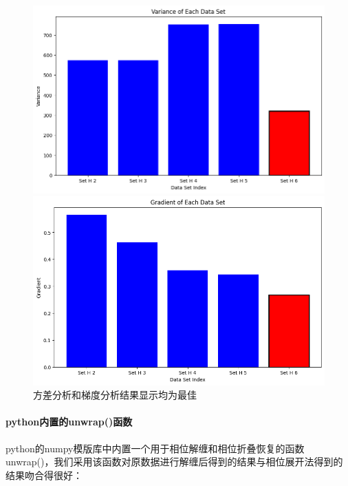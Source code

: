 \documentclass[a4paper]{article}
\begin{document}
	\begin{figure}[H]
		\centering
		\begin{minipage}[b]{0.4\textwidth}
			\centering
			\includegraphics[width=\linewidth]{t1/best_test_1.png}
		\end{minipage}
		\hspace{0.05\textwidth}
		\begin{minipage}[b]{0.4\textwidth}
			\centering
			\includegraphics[width=\linewidth]{t1/best_test_2.png}
		\end{minipage}
		
		\caption{方差分析和梯度分析结果显示均为最佳}
		\label{fig:best_height_test}
	\end{figure}

	\paragraph{python内置的unwrap()函数}
	python的numpy模版库中内置一个用于相位解缠和相位折叠恢复的函数unwrap()，我们采用该函数对原数据进行解缠后得到的结果与相位展开法得到的结果吻合得很好：\par
\end{document}
